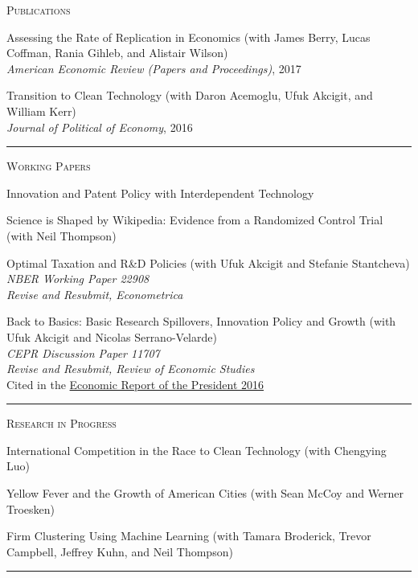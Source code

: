 \documentclass{article}
\begin{document}
\parbox{\textwidth}{
\parbox[t]{0.28\textwidth}{ \raggedright \noindent \textsc{ Publications } }
\parbox[t]{0.72\textwidth}{ \raggedright

Assessing the Rate of Replication in Economics (with James Berry, Lucas Coffman, Rania Gihleb, and Alistair Wilson) \\
\textit{American Economic Review (Papers and Proceedings)}, 2017
\vspace{0.27cm}

Transition to Clean Technology (with Daron Acemoglu, Ufuk Akcigit, and William Kerr) \\
\textit{Journal of Political of Economy}, 2016
\vspace{0.27cm}

}
\textcolor{light-gray}{\hrule}
}
\vspace{0.3cm}

\parbox{\textwidth}{
\parbox[t]{0.28\textwidth}{ \raggedright \noindent \textsc{ Working Papers } }
\parbox[t]{0.72\textwidth}{ \raggedright

Innovation and Patent Policy with Interdependent Technology
\vspace{0.27cm}

Science is Shaped by Wikipedia: Evidence from a Randomized Control Trial (with Neil Thompson)
\vspace{0.27cm}

Optimal Taxation and R\&D Policies (with Ufuk Akcigit and Stefanie Stantcheva)  \\
 \textit{NBER Working Paper 22908}  \\
 \textit{Revise and Resubmit, Econometrica}
\vspace{0.27cm}

Back to Basics: Basic Research Spillovers, Innovation Policy and Growth (with Ufuk Akcigit and Nicolas Serrano-Velarde)  \\
 \textit{CEPR Discussion Paper 11707}  \\
 \textit{Revise and Resubmit, Review of Economic Studies}  \\
 Cited in the \href{https://www.gpo.gov/fdsys/pkg/ERP-2016/pdf/ERP-2016.pdf}{Economic Report of the President 2016}
\vspace{0.27cm}

}
\textcolor{light-gray}{\hrule}
}
\vspace{0.3cm}

\parbox{\textwidth}{
\parbox[t]{0.28\textwidth}{ \raggedright \noindent \textsc{ Research in Progress } }
\parbox[t]{0.72\textwidth}{ \raggedright

International Competition in the Race to Clean Technology (with Chengying Luo)
\vspace{0.27cm}

Yellow Fever and the Growth of American Cities (with Sean McCoy and Werner Troesken)
\vspace{0.27cm}

Firm Clustering Using Machine Learning (with Tamara Broderick, Trevor Campbell, Jeffrey Kuhn, and Neil Thompson)
\vspace{0.27cm}

}
\textcolor{light-gray}{\hrule}
}
\vspace{0.3cm}
\end{document}
